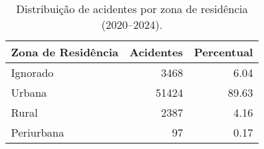 \begin{table}
\caption{Distribuição de acidentes por zona de residência (2020–2024).}
\begin{tabular}{lrr}
\toprule
Zona de Residência & Acidentes & Percentual \\
\midrule
Ignorado & 3468 & 6.04 \\
Urbana & 51424 & 89.63 \\
Rural & 2387 & 4.16 \\
Periurbana & 97 & 0.17 \\
\bottomrule
\end{tabular}
\end{table}

